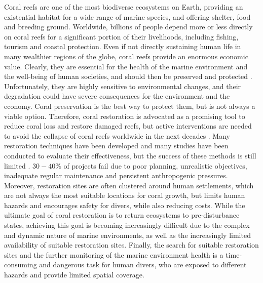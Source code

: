 Coral reefs are one of the most biodiverse ecosystems on Earth, providing an existential habitat for a wide range of marine species,
and offering shelter, food and breeding ground. Worldwide, billions of people depend more or less
directly on coral reefs for a significant portion of their livelihoods, including fishing, tourism and coastal protection.
Even if not directly sustaining human life in many wealthier regions of the globe, coral reefs
provide an enormous economic value. Clearly, they are essential for the health of the marine environment
and the well-being of human societies, and should then be preserved and protected \cite{erftemeijer2012environmental}.
Unfortunately, they are highly sensitive
to environmental changes, and their degradation could have severe consequences for the 
environment and the economy. Coral preservation is the best way to protect them, but is not always
a viable option. Therefore, coral restoration is advocated as a promising tool to reduce coral
loss and restore damaged reefs, but active interventions are needed to avoid the collapse of coral reefs 
worldwide in the next decades \cite{burdett2024restoration}. Many restoration techniques have been developed and many 
studies have been conducted to evaluate their effectiveness, but the success of these methods
is still limited \cite{mula2025restoration}. $30-40\%$ of projects fail due to poor planning, 
unrealistic objectives, inadequate regular maintenance and persistent anthropogenic pressures. 
Moreover, restoration sites are often clustered around human settlements, which are not always 
the most suitable locations for coral growth, but limits human hazards and encourages safety 
for divers, while also reducing costs. 
While the ultimate goal of coral restoration is to return ecosystems to pre-disturbance states, achieving this goal 
is becoming increasingly difficult due to the complex and dynamic nature of marine environments, as well as the
increasingly limited availability of suitable restoration sites. 
Finally, the search for suitable restoration sites and the further monitoring of the marine environment health is 
a time-consuming and dangerous task for human divers, who are exposed to different hazards and provide
limited spatial coverage.

